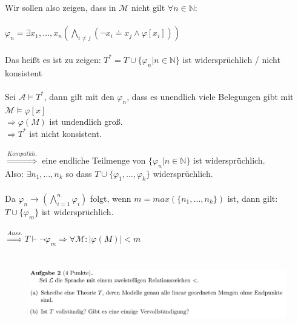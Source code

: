 \documentclass[a4paper]{scrartcl}
\begin{document}
    Wir sollen also zeigen, dass in $\mathcal{M}$ nicht gilt $\forall n \in \mathds{N}$:\\
    \\$\varphi_n = \exists x_1,\dots,x_n(\bigwedge_{i \neq j} (\neg x_i \doteq x_j \land \varphi[x_i]))$\\
    \\Das heißt es ist zu zeigen: $T^* = T \cup \{\varphi_n | n \in \mathds{N}\}$ ist widersprüchlich / nicht konsistent\\
    \\Sei $\mathcal{A} \vDash T^*$, dann gilt mit den $\varphi_n$, dass es unendlich viele Belegungen gibt mit $\mathcal{M} \vDash \varphi[x]$\\
    $\Rightarrow \varphi(M)$ ist undendlich groß.\\
    $\Rightarrow T^*$ ist nicht konsistent.\\
    \\$\overset{Kompatkh.}{\Rightarrow}$ eine endliche Teilmenge von $\{\varphi_n | n \in \mathds{N}\}$ ist widersprüchlich.\\
    Also: $\exists n_1,\dots,n_k$ so dass $T \cup \{\varphi_1,\dots,\varphi_k\}$ widersprüchlich.\\
    \\Da $\varphi_n \rightarrow (\bigwedge_{i=1}^n \varphi_i)$ folgt, wenn $m = max(\{n_1, \dots, n_k\})$ ist, dann gilt:\\
    $T \cup \{\varphi_m\}$ ist widersprüchlich.\\
    \\$\overset{Auss.}{\Rightarrow} T \vdash \neg \varphi_m \Rightarrow \forall \mathcal{M}: |\varphi(M)| < m$\\


\newpage

\section*{}
\label{sec:aufgabe_2}

    \begin{figure}[H]
        \centering
        \includegraphics[scale=0.3]{./A-2.png}
        \label{fig:}
    \end{figure}
\end{document}
